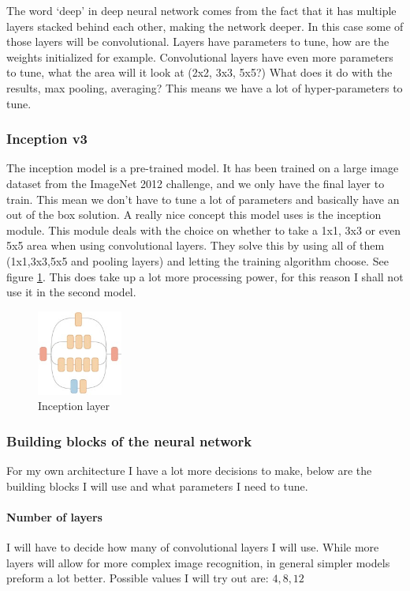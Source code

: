 \documentclass[11pt]{article}
\begin{document}
The word `deep' in deep neural network comes from the fact that it has multiple layers stacked behind each other, making the network deeper. In this case some of those layers will be convolutional. Layers have parameters to tune, how are the weights initialized for example. Convolutional layers have even more parameters to tune, what the area will it look at (2x2, 3x3, 5x5?) What does it do with the results, max pooling, averaging? This means we have a lot of hyper-parameters to tune. 	

\subsubsection{Inception v3}
The inception model is a pre-trained model. It has been trained on a large image dataset from the ImageNet 2012 challenge, and we only have the final layer to train. This mean we don't have to tune a lot of parameters and basically have an out of the box solution. A really nice concept this model uses is the inception module. This module deals with the choice on whether to take a 1x1, 3x3 or even 5x5 area when using convolutional layers. They solve this by using all of them (1x1,3x3,5x5 and pooling layers) and letting the training algorithm choose. See figure \ref{fig:inceptionlayer}. This does take up a lot more processing power, for this reason I shall not use it in the second model.

\begin{figure}
    \centering
    \includegraphics[width=0.25\textwidth]{images/inception-layer}
    \caption{Inception layer}
    \label{fig:inceptionlayer}
\end{figure}

\subsubsection{Building blocks of the neural network}
For my own architecture I have a lot more decisions to make, below are the building blocks I will use and what parameters I need to tune.

\paragraph{Number of layers}
I will have to decide how many of convolutional layers I will use. While more layers will allow for more complex image recognition, in general simpler models preform a lot better. Possible values I will try out are: ${4, 8, 12}$
\end{document}
